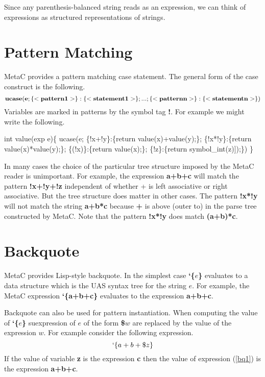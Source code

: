 \documentclass{article}
\begin{document}
Since any parenthesis-balanced string reads as an expression, we can think of expressions as structured representations of strings.

\section{Pattern Matching}

MetaC provides a pattern matching case statement.
The general form of the case construct is the following.
$${\bf ucase(e; \{<pattern1>\}:\{<statement1>\}; ... ;\{<patternn>\}:\{<statementn>\})}$$
Variables are marked in patterns by the symbol tag {\bf !}. For example we might write the following.

\begin{code}
int value(exp e)\{
  ucase(e;
   \{!x+!y\}:\{return value(x)+value(y);\};
   \{!x*!y\}:\{return value(x)*value(y);\};
   \{(!x)\}:\{return value(x);\};
   \{!z\}:\{return symbol\_int(z)]);\})
\}
\end{code}

In many cases the choice of the particular tree structure imposed by the MetaC reader is unimportant.  For example, the expression {\bf a+b+c} will match the pattern
{\bf !x+!y+!z} independent of whether + is left associative or right associative.  But the tree structure does matter in other cases.  The pattern {\bf !x*!y}
will not match the string {\bf a+b*c} because {\bf +} is above (outer to) {\bf *} in the parse tree constructed by MetaC. Note that the pattern {\bf !x*!y} does match {\bf (a+b)*c}.

\section{Backquote}

MetaC provides Lisp-style backquote.
In the simplest case {\bf `\{$e$\}} evaluates to a data structure which is the UAS syntax tree for
the string $e$.  For example, the MetaC expression {\bf `\{a+b+c\}}
evaluates to the expression {\bf a+b+c}.

Backquote can also be used for pattern instantiation.
When computing the value of {\bf `\{$e$\}} suexpression of $e$ of the form {\bf \$$w$} are replaced by the value of the expression $w$.
For example consider the following expression.
\begin{equation}
\label{bq1}
`\{a+b+\$z\}
\end{equation}
If the value of variable {\bf z} is the expression {\bf c} then the value of expression (\ref{bq1}) is the expression {\bf a+b+c}.
\end{document}
